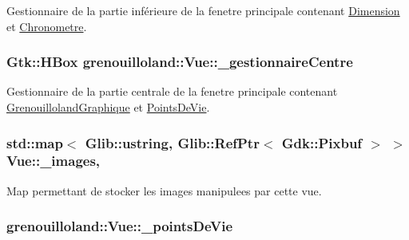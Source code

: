 Gestionnaire de la partie inférieure de la fenetre principale contenant \hyperlink{classgrenouilloland_1_1Dimension}{Dimension} et \hyperlink{classgrenouilloland_1_1Chronometre}{Chronometre}. \hypertarget{classgrenouilloland_1_1Vue_a64a3b9c74425f9a70fbae4c5bc7d9c78}{
\subsubsection[{\-\_\-gestionnaire\-Centre}]{\setlength{\rightskip}{0pt plus 5cm}Gtk\-::\-H\-Box grenouilloland\-::\-Vue\-::\-\_\-gestionnaire\-Centre\hspace{0.3cm}{\ttfamily [protected]}}}\label{classgrenouilloland_1_1Vue_a64a3b9c74425f9a70fbae4c5bc7d9c78}
Gestionnaire de la partie centrale de la fenetre principale contenant \hyperlink{classgrenouilloland_1_1GrenouillolandGraphique}{Grenouilloland\-Graphique} et \hyperlink{classgrenouilloland_1_1PointsDeVie}{Points\-De\-Vie}. \hypertarget{classgrenouilloland_1_1Vue_a1ad2483d0795c038267934208730d415}{
\subsubsection[{\-\_\-images}]{\setlength{\rightskip}{0pt plus 5cm}std\-::map$<$ Glib\-::ustring, Glib\-::\-Ref\-Ptr$<$ Gdk\-::\-Pixbuf $>$ $>$ Vue\-::\-\_\-images\hspace{0.3cm}{\ttfamily [static]}, {\ttfamily [protected]}}}\label{classgrenouilloland_1_1Vue_a1ad2483d0795c038267934208730d415}
Map permettant de stocker les images manipulees par cette vue. \hypertarget{classgrenouilloland_1_1Vue_af6f2bba3b33001e5c0807d8e98c0b0fa}{
\subsubsection[{\-\_\-points\-De\-Vie}]{ grenouilloland\-::\-Vue\-::\-\_\-points\-De\-Vie\hspace{0.3cm}{\ttfamily [protected]}}}\label{classgrenouilloland_1_1Vue_af6f2bba3b33001e5c0807d8e98c0b0fa}

